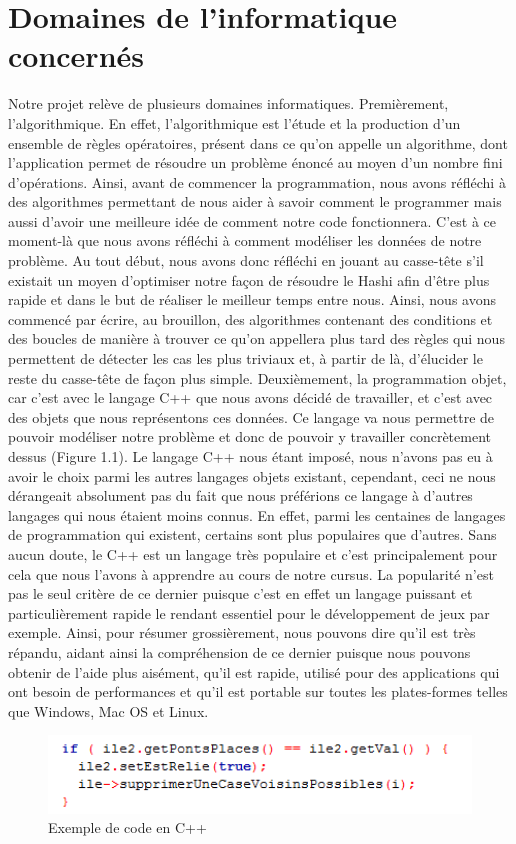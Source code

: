 \chapter{Domaines de l'informatique concernés}
\label{chap:domaines}

Notre projet relève de plusieurs domaines informatiques.
\newline
Premièrement, l'algorithmique. En effet, l'algorithmique est l'étude et la production d'un ensemble de règles opératoires, présent dans ce qu'on appelle un algorithme, dont l'application permet de résoudre un problème énoncé au moyen d'un nombre fini d'opérations. Ainsi, avant de commencer la programmation, nous avons réfléchi à des algorithmes permettant de nous aider à savoir comment le programmer mais aussi d'avoir une meilleure idée de comment notre code fonctionnera. C'est à ce moment-là que nous avons réfléchi à comment modéliser les données de notre problème. Au tout début, nous avons donc réfléchi en jouant au casse-tête s'il existait un moyen d'optimiser notre façon de résoudre le Hashi afin d'être plus rapide et dans le but de réaliser le meilleur temps entre nous. Ainsi, nous avons commencé par écrire, au brouillon, des algorithmes contenant des conditions et des boucles de manière à trouver ce qu'on appellera plus tard des règles qui nous permettent de détecter les cas les plus triviaux et, à partir de là, d'élucider le reste du casse-tête de façon plus simple. 
\smallbreak
Deuxièmement, la programmation objet, car c'est avec le langage C++ que nous avons décidé de travailler, et c'est avec des objets que nous représentons ces données. Ce langage va nous permettre de pouvoir modéliser notre problème et donc de pouvoir y travailler concrètement dessus (Figure 1.1). Le langage C++ nous étant imposé, nous n'avons pas eu à avoir le choix parmi les autres langages objets existant, cependant, ceci ne nous dérangeait absolument pas du fait que nous préférions ce langage à d'autres langages qui nous étaient moins connus. En effet, parmi les centaines de langages de programmation qui existent, certains sont plus populaires que d'autres. Sans aucun doute, le C++ est un langage très populaire et c'est principalement pour cela que nous l'avons à apprendre au cours de notre cursus. La popularité n'est pas le seul critère de ce dernier puisque c'est en effet un langage puissant et particulièrement rapide le rendant essentiel pour le développement de jeux par exemple. Ainsi, pour résumer grossièrement, nous pouvons dire qu'il est très répandu, aidant ainsi la compréhension de ce dernier puisque nous pouvons obtenir de l'aide plus aisément, qu'il est rapide, utilisé pour des applications qui ont besoin de performances et qu'il est portable sur toutes les plates-formes telles que Windows, Mac OS et Linux.\newline

\begin{figure}[htp]
  \centering
  \includegraphics[width=13cm]{images/exemplec++}
  \caption{Exemple de code en C++}
\end{figure}

